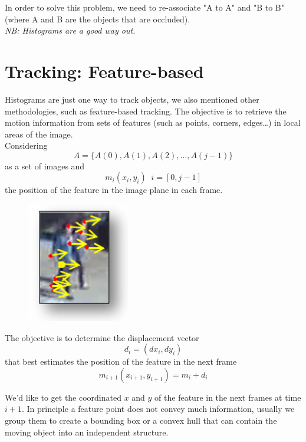 In order to solve this problem, we need to re-associate "A to A" and "B to B" (where A and B are the objects that are occluded). 
\\\textit{NB: Histograms are a good way out.}

\section{Tracking: Feature-based}

Histograms are just one way to track objects, we also mentioned other methodologies, such as feature-based tracking. The objective is to retrieve the motion information from sets of features (such as points, corners, edges\dots) in local areas of the image.
\\Considering
\[
    A = \{A(0), A(1), A(2), \dots, A(j-1)\}
\] 
as a set of images and
\[
    m_i(x_i, y_i)\;\;i = [0, j-1] 
\] 
the position of the feature in the image plane in each frame.

\begin{figure}
    \includegraphics[scale=0.3]{Figures/Tracking.png}
\end{figure}
The objective is to determine the displacement vector 
\[
    d_i = (dx_i, dy_i)
\] 
that best estimates the position of the feature in the next frame 
\[
    m_{i+1}(x_{i+1}, y_{i+1}) = m_i + d_i
\]

We'd like to get the coordinated \(x\) and \(y\) of the feature in the next frames at time \(i+1\).
In principle a feature point does not convey much information, usually we group them to create a bounding box or a convex hull that can contain the moving object into an independent structure.

